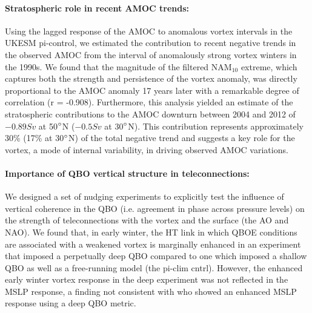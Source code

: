 \paragraph{Stratospheric role in recent AMOC trends:}
Using the lagged response of the AMOC to anomalous vortex intervals in the UKESM pi-control, we estimated the contribution to recent negative trends in the observed AMOC from the interval of anomalously strong vortex winters in the 1990s. We found that the magnitude of the filtered NAM$_{10}$ extreme, which captures both the strength and persistence of the vortex anomaly, was directly proportional to the AMOC anomaly 17 years later with a remarkable degree of correlation (r = -0.908). Furthermore, this analysis yielded an estimate of the stratospheric contributions to the AMOC downturn between 2004 and 2012 of $-0.89Sv$ at 50$\degree$N ($-0.5Sv$ at 30$\degree$N). This contribution represents approximately 30\% (17\% at 30$\degree$N) of the total negative trend and suggests a key role for the vortex, a mode of internal variability, in driving observed AMOC variations. 

\paragraph{Importance of QBO vertical structure in teleconnections:}
We designed a set of nudging experiments to explicitly test the influence of vertical coherence in the QBO (i.e. agreement in phase across pressure levels) on the strength of teleconnections with the vortex and the surface (the AO and NAO). We found that, in early winter, the HT link in which QBOE conditions are associated with a weakened vortex \citep{HoltonJamesRTan1980} is marginally enhanced in an experiment that imposed a perpetually deep QBO compared to one which imposed a shallow QBO as well as a free-running model (the pi-clim cntrl). However, the enhanced early winter vortex response in the deep experiment was not reflected in the MSLP response, a finding not consistent with \cite{andrewsObserved2019d} who showed an enhanced MSLP response using a deep QBO metric. 

